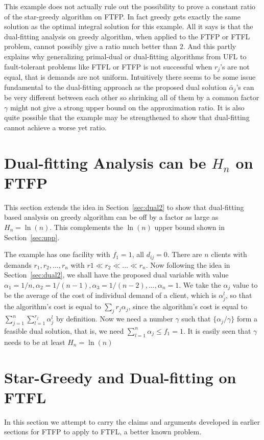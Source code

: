 \documentclass{article}[11pt]
\begin{document}
This example does not actually rule out the possibility to prove a
constant ratio of the star-greedy algorithm on FTFP. In fact greedy
gets exactly the same solution as the optimal integral solution for
this example. All it says is that the dual-fitting analysis on greedy
algorithm, when applied to the FTFP or FTFL problem, cannot possibly
give a ratio much better than $2$. And this partly explains why
generalizing primal-dual or dual-fitting algorithms from UFL to
fault-tolerant problems like FTFL or FTFP is not successful when
$r_j$'s are not equal, that is demands are not uniform. Intuitively
there seems to be some issue fundamental to the dual-fitting approach
as the proposed dual solution $\bar\alpha_j$'s can be very different
between each other so shrinking all of them by a common factor
$\gamma$ might not give a strong upper bound on the approximation
ratio. It is also quite possible that the example may be strengthened
to show that dual-fitting cannot achieve a worse yet ratio.

\section{Dual-fitting Analysis can be $H_n$ on FTFP}
This section extends the idea in Section~\ref{sec:dual2} to show that
dual-fitting based analysis on greedy algorithm can be off by a factor
as large as $H_n = \ln(n)$. This complements the $\ln(n)$ upper bound
shown in Section~\ref{sec:upp}.

The example has one facility with $f_1 = 1$, all $d_{ij}=0$. There are
$n$ clients with demands $r_1, r_2, \ldots, r_n$ with $r1 \ll r_2 \ll
\ldots \ll r_n$. Now following the idea in Section~\ref{sec:dual2}, we
shall have the proposed dual variable with value $\alpha_1=1/n,
\alpha_2 = 1/(n-1), \alpha_3 = 1/(n-2), \ldots, \alpha_n = 1$. We take
the $\alpha_j$ value to be the average of the cost of individual
demand of a client, which is $\alpha_j^l$, so that the algorithm's
cost is equal to $\sum_{j} r_j\alpha_j$, since the algorithm's cost is
equal to $\sum_{j=1}^n \sum_{l=1}^{r_j} \alpha_j^l$ by definition. Now
we need a number $\gamma$ such that $\{\alpha_j/\gamma\}$ form a
feasible dual solution, that is, we need $\sum_{l=1}^n \alpha_j \leq
f_1 = 1$. It is easily seen that $\gamma$ needs to be at least $H_n =
\ln(n)$

\section{Star-Greedy and Dual-fitting on FTFL}
In this section we attempt to carry the claims and arguments developed
in earlier sections for FTFP to apply to FTFL, a better known
problem.
\end{document}
